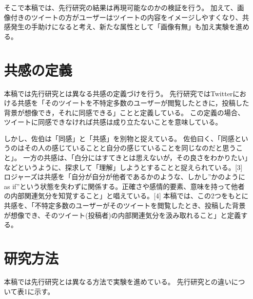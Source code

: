 \documentclass[dvipdfmx]{issj}
\begin{document}
そこで本稿では、先行研究の結果は再現可能なのかの検証を行う。
加えて、画像付きのツイートの方がユーザーはツイートの内容をイメージしやすくなり、共感発生の手助けになると考え、新たな属性として「画像有無」も加え実験を進める。




\section{共感の定義}  %
本稿では先行研究とは異なる共感の定義づけを行う。
先行研究ではTwitterにおける共感を「そのツイートを不特定多数のユーザーが閲覧したときに，投稿した背景が想像でき，それに同感できる」ことと定義している。
この定義の場合、ツイートに同感できなければ共感は成り立たないことを意味している。


しかし、佐伯は「同感」と「共感」を別物と捉えている。
佐伯曰く、「同感というのはその人の感じていることと自分の感じていることを同じなのだと思うこと」。
一方の共感は、「白分にはすてきとは思えないが，その良さをわかりたい」などというように、探求して「理解」しようとすることと捉えられている。[3]
ロジャーズは共感を「自分が自分が他者であるかのような、しかし”かのようにas if”という状態を失わずに関係する。正確さや感情的要素、意味を持って他者の内部関連気分を知覚すること」と唱えている。[4] 
本稿では、この2つをもとに共感を、「不特定多数のユーザーがそのツイートを閲覧したとき、投稿した背景が想像でき、そのツイート(投稿者)の内部関連気分を汲み取れること」と定義する。



\section{研究方法}  %
本稿では先行研究とは異なる方法で実験を進めている。
先行研究との違いについて表1に示す。
\end{document}
